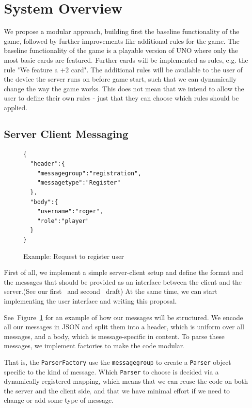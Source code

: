 \documentclass{sig-alternate}
\newcommand{\lfig}[1]{\label{fig:#1}}
\newcommand{\rfig}[1]{Figure~\ref{fig:#1}}
\begin{document}
\section{System Overview}
We propose a modular approach, building first the baseline functionality of the game, followed by further improvements like additional rules for the game. The baseline functionality of the game is a playable version of UNO where only the most basic cards are featured. Further cards will be implemented as rules, e.g. the rule "We feature a +2 card". The additional rules will be available to the user of the device the server runs on before game start, such that we can dynamically change the way the game works. This does not mean that we intend to allow the user to define their own rules - just that they can choose which rules should be applied.

\subsection{Server Client Messaging}
\begin{figure}[!htbp]
\begin{verbatim}
{
  "header":{
    "messagegroup":"registration",
    "messagetype":"Register"
  },
  "body":{
    "username":"roger",
    "role":"player"
  }
}
\end{verbatim}
\caption{Example: Request to register user}
\lfig{regmsg}
\end{figure}

First of all, we implement a simple server-client setup and define the format and the messages that should be provided as an interface between the client and the server.(See our first~\cite{messaging} and second~\cite{messaging2} draft) At the same time, we can start implementing the user interface and writing this proposal.

See~\rfig{regmsg} for an example of how our messages will be structured. We encode all our messages in JSON and split them into a header, which is uniform over all messages, and a body, which is message-specific in content. To parse these messages, we implement factories to make the code modular.

That is, the \verb|ParserFactory| use the \verb|messagegroup| to create a \verb|Parser| object specific to the kind of message. Which \verb|Parser| to choose is decided via a dynamically registered mapping, which means that we can reuse the code on both the server and the client side, and that we have minimal effort if we need to change or add some type of message.
\end{document}
